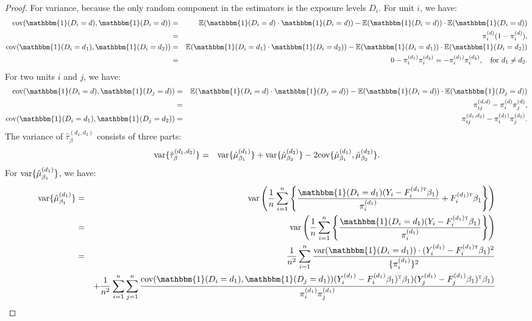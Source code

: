 \documentclass[twoside]{article}
\theoremstyle{plain}
\theoremstyle{definition}
\theoremstyle{remark}
\newcommand{\E}{\mathbb{E}}
\def\T{{\textsc{t}}}
\newcommand{\cov}{\textup{cov}}
\newcommand{\var}{\textup{var}}
\newcommand{\indicator}{\mathbbm{1}}
\newcommand{\sumi}{\sum_{i=1}^n}
\newcommand{\sumij}{\sum_{i=1}^{n} \sum_{j=1}^{n}}
\begin{document}
\begin{proof}
    For variance, because the only random component in the estimators is the exposure levels $D_i$. For unit $i$, we have:
    \begin{eqnarray*}
        \cov(\indicator(D_i=d), \indicator(D_i=d)) &=& \E(\indicator(D_i=d) \cdot \indicator(D_i=d)) - \E(\indicator(D_i=d)) \cdot \E(\indicator(D_i=d)) \\
        &=& \pi_i^{(d)}(1 - \pi_i^{(d)}), \\
        \cov(\indicator(D_i=d_1), \indicator(D_i=d_2)) &=& \E(\indicator(D_i=d_1) \cdot \indicator(D_i=d_2)) - \E(\indicator(D_i=d_1)) \cdot \E(\indicator(D_i=d_2)) \\
        &=& 0 - \pi_i^{(d_1)}\pi_i^{(d_2)} = - \pi_i^{(d_1)}\pi_i^{(d_2)}, \quad \text{for } d_1\neq d_2.
    \end{eqnarray*}
    For two units $i$ and $j$, we have:
    \begin{eqnarray*}
        \cov(\indicator(D_i=d), \indicator(D_j=d)) &=& \E(\indicator(D_i=d) \cdot \indicator(D_j=d)) - \E(\indicator(D_i=d)) \cdot \E(\indicator(D_j=d)) \\
        &=& \pi_{ij}^{(d,d)} - \pi_i^{(d)}\pi_j^{(d)}, \\
        \cov(\indicator(D_i=d_1), \indicator(D_j=d_2)) &=& \pi_{ij}^{(d_1,d_2)} - \pi_i^{(d_1)}\pi_j^{(d_2)} .
    \end{eqnarray*}
    The variance of $\hat\tau^{(d_1, d_2)}_{\beta}$ consists of three parts:
    \begin{eqnarray*}
        \var\{\hat\tau^{(d_1, d_2)}_{\beta}\} &=& \var\{\hat\mu^{(d_1)}_{\beta_1}\} + \var\{\hat\mu^{(d_2)}_{\beta_2}\} - 2\cov\{\hat\mu^{(d_1)}_{\beta_1}, \hat\mu^{(d_2)}_{\beta_2}\}.
    \end{eqnarray*}
    For $\var\{\hat\mu^{(d_1)}_{\beta_1}\}$, we have:
    \begin{eqnarray*}
        \var\{\hat\mu^{(d_1)}_{\beta_1}\} &=& \var\left(\frac{1}{n}\sumi \left\{ \frac{\indicator(D_i=d_1)(Y_i-F_i^{(d_1)\T} \beta_1)}{\pi_i^{(d_1)}} + F_i^{(d_1)\T}\beta_1 \right\}\right) \\
        &=& \var\left(\frac{1}{n}\sumi \left\{ \frac{\indicator(D_i=d_1)(Y_i-F_i^{(d_1)\T} \beta_1)}{\pi_i^{(d_1)}} \right\}\right)\\
        &=& \frac{1}{n^2} \sumi \frac{\var(\indicator(D_i = d_1)) \cdot (Y_i^{(d_1)} - F_i^{(d_1)\T}\beta_1)^2}{\{\pi_i^{(d_1)}\}^2}\\
        &&  + \frac{1}{n^2} \sumij \frac{\cov(\indicator(D_i=d_1), \indicator(D_j=d_1)) (Y_i^{(d_1)} - F_i^{(d_1)}\beta_1)^{\T} \beta_1)(Y_j^{(d_1)} - F_j^{(d_1)}\beta_1)^{\T} \beta_1)}{\pi_i^{(d_1)}\pi_j^{(d_1)}} \\

\end{eqnarray*}
\end{proof}
\end{document}
